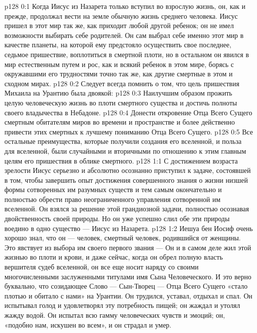 \author{Комиссия срединников}
\vs p128 0:1 Когда Иисус из Назарета только вступил во взрослую жизнь, он, как и прежде, продолжал вести на земле обычную жизнь среднего человека. Иисус пришел в этот мир так же, как приходит любой другой ребенок; он не имел возможности выбирать себе родителей. Он сам выбрал себе именно этот мир в качестве планеты, на которой ему предстояло осуществить свое последнее, седьмое пришествие, воплотиться в смертной плоти, но в остальном он явился в мир естественным путем и рос, как и всякий ребенок в этом мире, борясь с окружавшими его трудностями точно так же, как другие смертные в этом и сходном мирах.
\vs p128 0:2 Следует всегда помнить о том, что цель пришествия Михаила на Урантию была двоякой:
\vs p128 0:3 \bibnobreakspace Наилучшим образом прожить целую человеческую жизнь во плоти смертного существа и достичь полноты своего владычества в Небадоне.
\vs p128 0:4 \pc {}\bibnobreakspace Донести откровение Отца Всего Сущего смертным обитателям миров во времени и пространстве и более действенно привести этих смертных к лучшему пониманию Отца Всего Сущего.
\vs p128 0:5 \pc Все остальные преимущества, которые получили создания его вселенной, и польза для вселенной, были случайными и вторичными по отношению к этим главным целям его пришествия в облике смертного.
\vs p128 1:1 С достижением возраста зрелости Иисус серьезно и абсолютно осознанно приступил к задаче, состоявшей в том, чтобы завершить опыт достижения совершенного знания о жизни низшей формы сотворенных им разумных существ и тем самым окончательно и полностью обрести право неограниченного управления сотворенной им вселенной. Он взялся за решение этой грандиозной задачи, полностью осознавая двойственность своей природы. Но он уже успешно слил обе эти природы воедино в одно существо --- Иисус из Назарета.
\vs p128 1:2 Иешуа бен Иосиф очень хорошо знал, что он --- человек, смертный человек, родившийся от женщины. Это явствует из выбора им своего первого звания ---  Он и в самом деле жил этой жизнью во плоти и крови, и даже сейчас, когда он обрел полную власть вершителя судеб вселенной, он все еще носит наряду со своими многочисленными заслуженными титулами имя Сына Человеческого. И это верно буквально, что созидающее Слово --- Сын\hyp{}Творец --- Отца Всего Сущего «стало плотью и обитало с нами» на Урантии. Он трудился, уставал, отдыхал и спал. Он испытывал голод и удовлетворял эту потребность пищей; он жаждал и утолял жажду водой. Он испытал всю гамму человеческих чувств и эмоций; он, «подобно нам, искушен во всем», и он страдал и умер.
